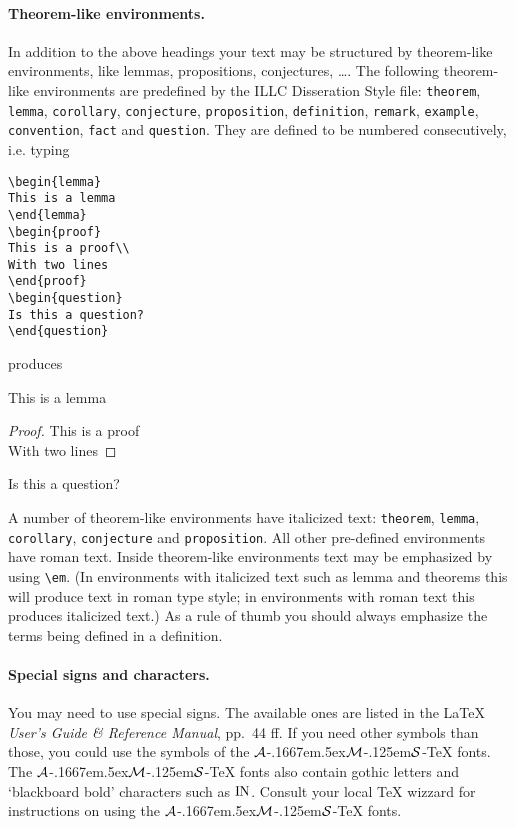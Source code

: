 \paragraph*{Theorem-like environments.}
In addition to the above headings your text may be structured 
by theorem-like environments, like lemmas, propositions, conjectures, \ldots .
The following theorem-like environments are predefined by the ILLC Disseration 
Style file: \verb|theorem|, \verb|lemma|, \verb|corollary|, \verb|conjecture|, 
\verb|proposition|, \verb|definition|, \verb|remark|, 
\verb|example|, \verb|convention|, \verb|fact| and \verb|question|.
They are defined to be numbered consecutively, i.e. typing
\begin{verbatim}
\begin{lemma}
This is a lemma
\end{lemma}
\begin{proof}
This is a proof\\
With two lines
\end{proof}
\begin{question}
Is this a question?
\end{question}
\end{verbatim}
produces
\begin{lemma}
This is a lemma
\end{lemma}
\begin{proof}
This is a proof\\
With two lines
\end{proof}
\begin{question}
Is this a question?
\end{question}

A number of theorem-like environments have italicized text:
\verb|theorem|, \verb|lemma|, \verb|corollary|, \verb|conjecture|
and \verb|proposition|. All other pre-defined environments have roman text.
Inside theorem-like environments text may be emphasized by
using \verb|\em|. (In environments with italicized text such as lemma
and theorems this will produce text in roman type style; in 
environments with roman text this produces italicized text.)
As a rule of thumb you should always emphasize the terms being
defined in a definition.

\paragraph*{Special signs and characters.}
\newcommand{\AmSTeX}{%
{$\cal A$}\kern-.1667em\lower.5ex\hbox
  {$\cal M$}\kern-.125em{$\cal S$}-\TeX
}
You may need to use special signs. The available ones are listed
in the \LaTeX{} {\em User's Guide \& Reference Manual\/}, pp.~44 ff.
If you need other symbols than those, you could use the symbols
of the \AmSTeX{} fonts. The  \AmSTeX{} fonts also contain gothic letters
and `blackboard bold' characters such as ${\rm I}\hskip -.3pt{\rm N}$. Consult
your local \TeX{} wizzard for instructions on using the \AmSTeX{} fonts.

